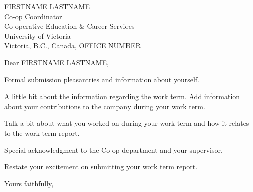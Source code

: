 \documentclass[12pt]{letter}
\begin{document}
\begin{letter}{
    FIRSTNAME LASTNAME \\
    Co-op Coordinator \\
    Co-operative Education \& Career Services \\
    University of Victoria \\
    Victoria, B.C., Canada, OFFICE NUMBER
  }

  \date{MONTH DAY, YEAR}      %

  \opening{Dear FIRSTNAME LASTNAME,}
  \medskip

  Formal submission pleasantries and information about yourself. \newline

  A little bit about the information regarding the work term. Add information about your contributions to the company during your work term. \newline

  Talk a bit about what you worked on during your work term and how it relates to the work term report. \newline

  Special acknowledgment to the Co-op department and your supervisor. \newline

  Restate your excitement on submitting your work term report.

  \closing{Yours faithfully,}

\end{letter}
\end{document}
